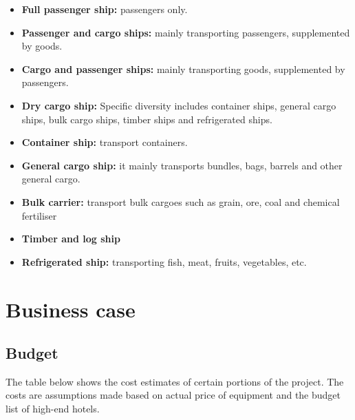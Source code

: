 \documentclass[11pt]{article}
\numberwithin{equation}{section}
\begin{document}
\begin{itemize}
\item \textbf{Full passenger ship:} passengers only.
\item \textbf{Passenger and cargo ships:} mainly transporting passengers, supplemented by goods.
\item \textbf{Cargo and passenger ships:} mainly transporting goods, supplemented by passengers.
\item \textbf{Dry cargo ship:} Specific diversity includes container ships, general cargo ships, bulk cargo ships, timber ships and refrigerated ships.
\item \textbf{Container ship:} transport containers.
\item \textbf{General cargo ship:} it mainly transports bundles, bags, barrels and other general cargo.
\item \textbf{Bulk carrier:} transport bulk cargoes such as grain, ore, coal and chemical fertiliser
\item \textbf{Timber and log ship}
\item \textbf{Refrigerated ship:} transporting fish, meat, fruits, vegetables, etc.
\end{itemize}

\section{Business case}
\label{sec:orge2987e4}
\subsection{Budget}
\label{sec:orga21cca8}
The table below shows the cost estimates of certain portions of the project. The costs are assumptions made based on actual price of equipment and the budget  list of high-end hotels.
\end{document}

